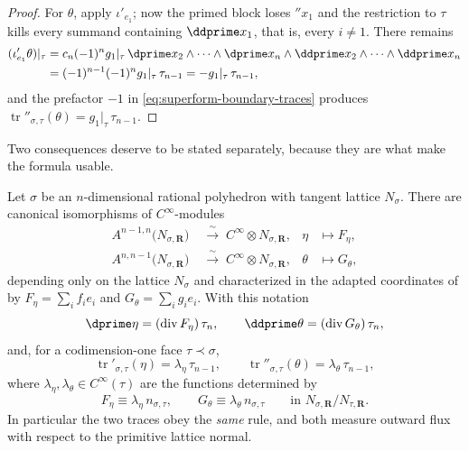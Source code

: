 \begin{proof}
For $\theta$, apply $\iota'_{e_1}$; now the primed block loses $\dprime x_1$
and the restriction to $\tau$ kills every summand containing
$\ddprime x_1$, that is, every $i\ne1$.  There remains
  \[
   \begin{aligned}
   (\iota'_{e_1}\theta)|_\tau
   & =c_n(-1)^{n}g_1|_\tau\,
     \dprime x_2\wedge\cdots\wedge\dprime x_n
     \wedge\ddprime x_2\wedge\cdots\wedge\ddprime x_n\\
   & =(-1)^{n-1}(-1)^{n}g_1|_\tau\,\tau_{n-1}
    =-g_1|_\tau\,\tau_{n-1},
   \end{aligned}
  \]
and the prefactor $-1$ in \eqref{eq:superform-boundary-traces} produces
$\operatorname{tr}''_{\sigma,\tau}(\theta)=g_1|_\tau\,\tau_{n-1}$.
\end{proof}

Two consequences deserve to be stated separately, because they are what make
the formula usable.

\begin{corollary}
\label{cor:ch11-trace-flux}
Let $\sigma$ be an $n$-dimensional rational polyhedron with tangent lattice
 $N_\sigma$.  There are canonical isomorphisms of $C^\infty$-modules
 \[
   \begin{aligned}
   A^{n-1,n}\bigl(N_{\sigma,\mathbf R}\bigr)
   &\;\xrightarrow{\ \sim\ }\;C^\infty\otimes N_{\sigma,\mathbf R},
   &\eta&\longmapsto F_\eta,\\
   A^{n,n-1}\bigl(N_{\sigma,\mathbf R}\bigr)
   &\;\xrightarrow{\ \sim\ }\;C^\infty\otimes N_{\sigma,\mathbf R},
   &\theta&\longmapsto G_\theta,
   \end{aligned}
 \]
depending only on the lattice $N_\sigma$ and characterized in the adapted
coordinates of  by
$F_\eta=\sum_if_ie_i$ and $G_\theta=\sum_ig_ie_i$.  With this notation
\[
 \dprime\eta=(\operatorname{div}F_\eta)\,\tau_n,
 \qquad
 \ddprime\theta=(\operatorname{div}G_\theta)\,\tau_n,
\]
and, for a codimension-one face $\tau\prec\sigma$,
\[
 \operatorname{tr}'_{\sigma,\tau}(\eta)=\lambda_\eta\,\tau_{n-1},
 \qquad
 \operatorname{tr}''_{\sigma,\tau}(\theta)=\lambda_\theta\,\tau_{n-1},
\]
where $\lambda_\eta,\lambda_\theta\in C^\infty(\tau)$ are the functions
determined by
\[
 F_\eta\equiv\lambda_\eta\,n_{\sigma,\tau},
 \qquad
 G_\theta\equiv\lambda_\theta\,n_{\sigma,\tau}
 \qquad\text{in }N_{\sigma,\mathbf R}/N_{\tau,\mathbf R}.
\]
In particular the two traces obey the \emph{same} rule, and both measure
outward flux with respect to the primitive lattice normal.
\end{corollary}

